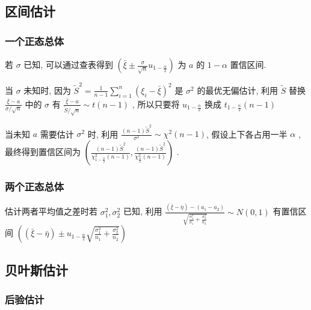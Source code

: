 \documentclass[10pt]{yerbaformat}
\begin{document}
\subsection{区间估计}


\subsubsection{一个正态总体}

\par 若 $\sigma$ 已知, 可以通过查表得到 $\left(\bar{\xi} \pm \frac{\sigma}{\sqrt{n}} u_{1-\frac{\alpha}{2}}\right)$ 为 $a$ 的 $1-\alpha$ 置信区间.

\par 当 $\sigma$ 未知时, 因为 $\tilde{S}^{2}=\frac{1}{n-1} \sum_{i=1}^{n}\left(\xi_{i}-\bar{\xi}\right)^{2}$ 是 $\sigma^{2}$ 的最优无偏估计, 利用 $\tilde{S}$ 替换 $\frac{\bar{\xi}-a}{\sigma / \sqrt{n}}$ 中的 $\sigma$ 有 $\frac{\bar{\xi}-a}{\tilde{S} / \sqrt{n}} \sim t(n-1)$ , 所以只要将 $u_{1-\frac{\alpha}{2}}$ 换成 $t_{1-\frac{\alpha}{2}}(n-1)$

\par 当未知 $a$ 需要估计 $\sigma^2$ 时, 利用 $\frac{(n-1) \tilde{S}^{2}}{\sigma^{2}} \sim \chi^{2}(n-1)$, 假设上下各占用一半 $\alpha$ , 最终得到置信区间为 $\left(\frac{(n-1) \tilde{S}^{2}}{\chi_{1-\frac{\alpha}{2}}^{2}(n-1)}, \frac{(n-1) \tilde{S}^{2}}{\chi_{\frac{\alpha}{2}}^{2}(n-1)}\right)$ .

\subsubsection{两个正态总体}
\par 估计两者平均值之差时若 $\sigma_{1}^{2}, \sigma_{2}^{2}$ 已知, 利用 $\frac{(\bar{\xi}-\bar{\eta})-\left(a_{1}-a_{2}\right)}{\sqrt{\frac{\sigma_{1}^{2}}{n_{1}}+\frac{\sigma_{2}^{2}}{n_{2}}}} \sim N(0,1)$ 有置信区间 $\left((\bar{\xi}-\bar{\eta}) \pm u_{1-\frac{\alpha}{2}} \sqrt{\frac{\sigma_{1}^{2}}{n_{1}}+\frac{\sigma_{2}^{2}}{n_{2}}}\right)$

\subsection{贝叶斯估计}

\subsubsection{后验估计}
\end{document}
